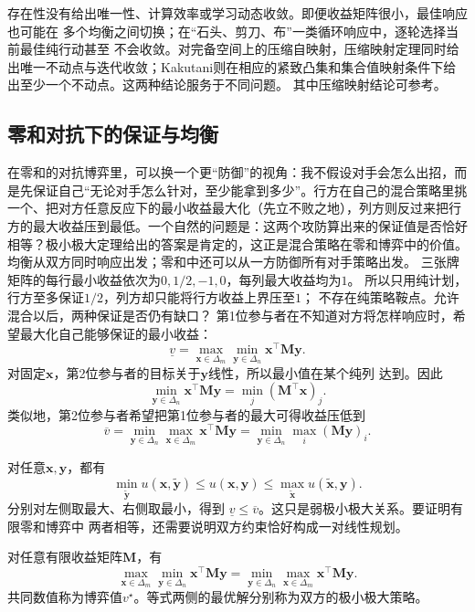存在性没有给出唯一性、计算效率或学习动态收敛。即便收益矩阵很小，最佳响应也可能在
多个均衡之间切换；在“石头、剪刀、布”一类循环响应中，逐轮选择当前最佳纯行动甚至
不会收敛。对完备空间上的压缩自映射，压缩映射定理同时给出唯一不动点与迭代收敛；Kakutani则在相应的紧致凸集和集合值映射条件下给出至少一个不动点。这两种结论服务于不同问题。
其中压缩映射结论可参考。

\subsection{零和对抗下的保证与均衡}
\label{sec:game-matrix-zero-sum-duality}

在零和的对抗博弈里，可以换一个更“防御”的视角：我不假设对手会怎么出招，而是先保证自己“无论对手怎么针对，至少能拿到多少”。行方在自己的混合策略里挑一个、把对方任意反应下的最小收益最大化（先立不败之地），列方则反过来把行方的最大收益压到最低。一个自然的问题是：这两个攻防算出来的保证值是否恰好相等？极小极大定理给出的答案是肯定的，这正是混合策略在零和博弈中的价值。
均衡从双方同时响应出发；零和中还可以从一方防御所有对手策略出发。
三张牌矩阵的每行最小收益依次为\(0,1/2,-1,0\)，每列最大收益均为\(1\)。
所以只用纯计划，行方至多保证\(1/2\)，列方却只能将行方收益上界压至\(1\)；
不存在纯策略鞍点。允许混合以后，两种保证是否仍有缺口？
第1位参与者在不知道对方将怎样响应时，希望最大化自己能够保证的最小收益：
\[
  \underline v
  =
  \max_{\bm{x}\in\Delta_m}
  \min_{\bm{y}\in\Delta_n}
  \bm{x}^{\top}\bm{M}\bm{y}.
\]
对固定\(\bm{x}\)，第2位参与者的目标关于\(\bm{y}\)线性，所以最小值在某个纯列
达到。因此
\[
  \min_{\bm{y}\in\Delta_n}
  \bm{x}^{\top}\bm{M}\bm{y}
  =
  \min_j(\bm{M}^{\top}\bm{x})_j.
\]
类似地，第2位参与者希望把第1位参与者的最大可得收益压低到
\[
  \overline v
  =
  \min_{\bm{y}\in\Delta_n}
  \max_{\bm{x}\in\Delta_m}
  \bm{x}^{\top}\bm{M}\bm{y}
  =
  \min_{\bm{y}\in\Delta_n}\max_i(\bm{M}\bm{y})_i.
\]

对任意\(\bm{x},\bm{y}\)，都有
\[
  \min_{\widetilde{\bm{y}}}
  u(\bm{x},\widetilde{\bm{y}})
  \leq
  u(\bm{x},\bm{y})
  \leq
  \max_{\widetilde{\bm{x}}}
  u(\widetilde{\bm{x}},\bm{y}).
\]
分别对左侧取最大、右侧取最小，得到
\(\underline v\leq\overline v\)。这只是弱极小极大关系。要证明有限零和博弈中
两者相等，还需要说明双方约束恰好构成一对线性规划。

\begin{theorem}[有限零和博弈的极小极大定理]
\label{thm:game-finite-minimax}
对任意有限收益矩阵\(\bm{M}\)，有
\begin{equation}
  \max_{\bm{x}\in\Delta_m}
  \min_{\bm{y}\in\Delta_n}
  \bm{x}^{\top}\bm{M}\bm{y}
  =
  \min_{\bm{y}\in\Delta_n}
  \max_{\bm{x}\in\Delta_m}
  \bm{x}^{\top}\bm{M}\bm{y}.
  \label{eq:game-minimax-equality}
\end{equation}
共同数值称为博弈值\(v^\star\)。等式两侧的最优解分别称为双方的极小极大策略。
\end{theorem}

